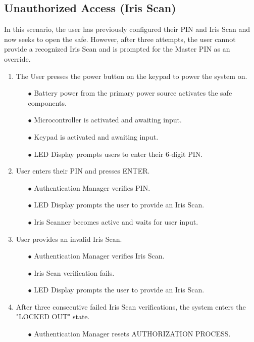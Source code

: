 \documentclass{article}
\begin{document}
\subsection{Unauthorized Access (Iris Scan)}
In this scenario, the user has previously configured their PIN and Iris Scan and now seeks to open the safe. However, after three attempts, the user cannot provide a recognized Iris Scan and is prompted for the Master PIN as an override.

\begin{enumerate}
    \item The User presses the power button on the keypad to power the system on.
    \begin{enumerate}
        \item[$\bullet$] Battery power from the primary power source activates the safe components.
        \item[$\bullet$] Microcontroller is activated and awaiting input.
        \item[$\bullet$] Keypad is activated and awaiting input.
        \item[$\bullet$] LED Display prompts users to enter their 6-digit PIN.
    \end{enumerate}
    \item User enters their PIN and presses ENTER.
    \begin{enumerate}
        \item[$\bullet$] Authentication Manager verifies PIN.
        \item[$\bullet$] LED Display prompts the user to provide an Iris Scan.
        \item[$\bullet$] Iris Scanner becomes active and waits for user input.
    \end{enumerate}
    \item User provides an invalid Iris Scan. 
    \begin{enumerate}
        \item[$\bullet$] Authentication Manager verifies Iris Scan.
        \item[$\bullet$] Iris Scan verification fails.
        \item[$\bullet$] LED Display prompts the user to provide an Iris Scan.
    \end{enumerate}
    \item After three consecutive failed Iris Scan verifications, the system enters the "LOCKED OUT" state.
    \begin{enumerate}
        \item[$\bullet$] Authentication Manager resets AUTHORIZATION PROCESS.

\end{enumerate}
\end{enumerate}
\end{document}
